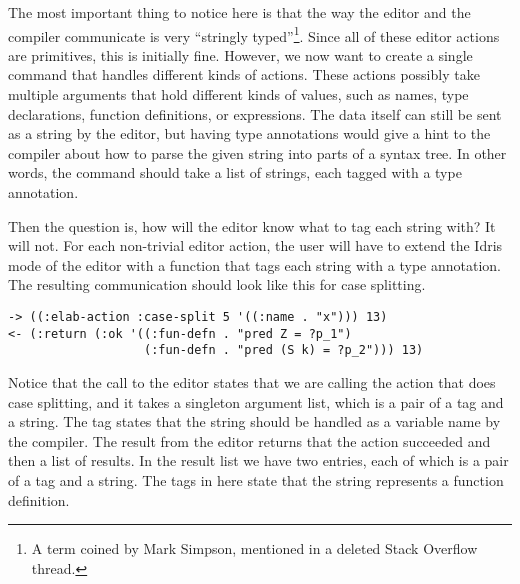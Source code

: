 The most important thing to notice here is that the way the editor and the
compiler communicate is very ``stringly typed''\footnote{A term coined by Mark
Simpson, mentioned in a deleted Stack Overflow thread.}.  Since all of these
editor actions are primitives, this is initially fine. However, we now want to
create a single command that handles different kinds of actions. These actions
possibly take multiple arguments that hold different kinds of values, such as
names, type declarations, function definitions, or expressions.
The data itself can still be sent as a string by the editor, but having type
annotations would give a hint to the compiler about how to parse the given
string into parts of a syntax tree. In other words, the command should take a
list of strings, each tagged with a type annotation.

Then the question is, how will the editor know what to tag each string with?
It will not. For each non-trivial editor action, the user will have to extend
the Idris mode of the editor with a function that tags each string with a type
annotation. The resulting communication should look like this for case splitting.

\begin{Verbatim}
-> ((:elab-action :case-split 5 '((:name . "x"))) 13)
<- (:return (:ok '((:fun-defn . "pred Z = ?p_1")
                   (:fun-defn . "pred (S k) = ?p_2"))) 13)
\end{Verbatim}

Notice that the call to the editor states that we are calling the 
action that does case splitting, and it takes a singleton argument list, which
is a pair of a tag and a string. The tag states that the string should be
handled as a variable name by the compiler.
The result from the editor returns that the action succeeded and then a list of
results.  In the result list we have two entries, each of which is a pair of a
tag and a string.  The tags in here state that the string represents a function
definition.

